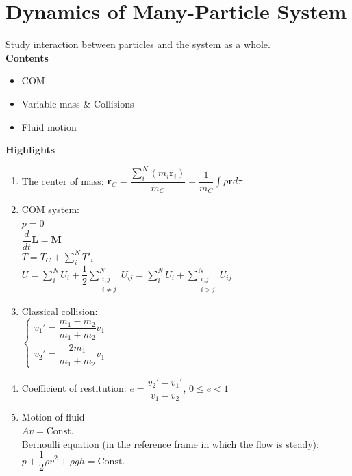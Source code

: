 \documentclass[11pt, a4paper, oneside]{book}
\numberwithin{equation}{section}%
\begin{document}

\section{Dynamics of Many-Particle System}

Study interaction between particles and the system as a whole.\\

\textbf{Contents}
	\begin{itemize}
		\item COM
		\item Variable mass \& Collisions
		\item Fluid motion
	\end{itemize}

\textbf{Highlights}
	\begin{enumerate}
		\item The center of mass: $\displaystyle{\bm{r}_C = \dfrac{\sum^N_i (m_i \bm{r}_i)}{m_C} = \dfrac{1}{m_C}\int \rho \bm{r}d\tau}$
		\item COM system: \\
		$p = 0$\\
		$\dfrac{d}{dt}\bm{L} = \bm{M}$\\
		$\displaystyle{T = T_C + \sum^N_i T'_i}$\\
		$\displaystyle{U = \sum^N_i U_i + \dfrac{1}{2}\sum^N_{\substack{i, j \\ i \neq j}} U_{ij} = \sum^N_i U_i + \sum^N_{\substack{i, j \\ i > j}} U_{ij}}$
		\item Classical collision: \\
		$\left\{\begin{aligned}
		v_1' = \dfrac{m_1 - m_2}{m_1 + m_2}v_1\\
		v_2' = \dfrac{2m_1}{m_1+m_2}v_1
		\end{aligned}\right.$
		\item Coefficient of restitution: $e = \dfrac{v_2' - v_1'}{v_1 - v_2} $, $ 0 \leq e < 1 $
		\item Motion of fluid\\
		$Av = \text{Const.}$\\
		Bernoulli equation (in the reference frame in which the flow is steady):\\
		$p + \dfrac{1}{2}\rho v^2 + \rho g h = \text{Const.}$
	\end{enumerate}

\end{document}

